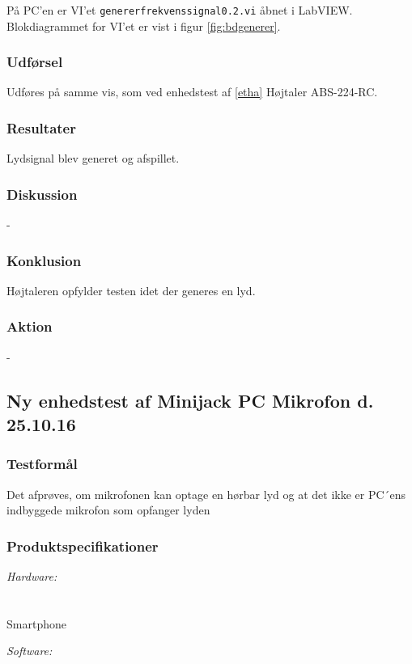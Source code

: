 		På PC'en er VI'et \texttt{genererfrekvenssignal0.2.vi} åbnet i LabVIEW. Blokdiagrammet for VI'et er vist i figur \ref{fig:bdgenerer}.   \\   
	
		
	
		\subsubsection{Udførsel}
			Udføres på samme vis, som ved enhedstest af \ref{etha} Højtaler ABS-224-RC. 
			
		\subsubsection{Resultater}
		Lydsignal blev generet og afspillet. 
		\subsubsection{Diskussion} 
		-
		\subsubsection{Konklusion}
		Højtaleren opfylder testen idet der generes en lyd. 
		\subsubsection{Aktion}
		- 
		
		\subsection{Ny enhedstest af Minijack PC Mikrofon d. 25.10.16}
		\subsubsection{Testformål}
		Det afprøves, om mikrofonen kan optage en hørbar lyd og at det ikke er PC´ens indbyggede mikrofon som opfanger lyden 
		\subsubsection{Produktspecifikationer}
	
			\textit{Hardware:}\\
			\mikrofon\\
			\PC\\
			Smartphone
	
			\textit{Software:}\\
			\labview\\
			\onlineg\\
	
